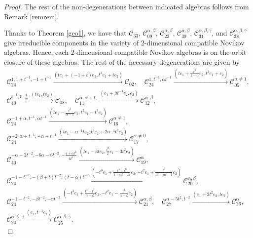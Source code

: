 \documentclass[pdftex]{sigma}
\numberwithin{equation}{section}
\begin{document}
\begin{proof}
The rest of the non-degenerations between indicated algebras follows from Remark \ref{remrem}.

Thanks to Theorem \ref{geo1}, we have that
$ \mathcal{C}_{33}$,
$ \mathcal{C}_{09}^{\alpha,\beta}$,
$ \mathcal{C}_{22}^{\alpha,\beta}$,
$ \mathcal{C}_{39}^{\alpha,\beta}$,
$ \mathcal{C}_{31}^{\alpha,\beta, \gamma}$, and
$ \mathcal{C}_{38}^{\alpha,\beta,\gamma}$
 give irreducible components in the variety of $2$-dimensional compatible Novikov algebras.
 Hence, each $2$-dimensional compatible Novikov algebras is on the orbit closure of these algebras. The rest of the necessary degenerations are given by
\begin{gather*}
 \mathcal{C}_{24}^{ 1,1+ t^{-1}, -1+ t^{-1}} \xrightarrow{ (te_1 +(-1+t) e_2, t^{2}e_1+t e_2 )} \mathcal{C}_{02} ,\quad
 \mathcal{C}_{24}^{ 1, t^{-1}, \alpha t^{-1}} \xrightarrow{ (te_1 +\frac{t^2}{1-\alpha} e_2, t^{2}e_1+ e_2 )} \mathcal{C}_{05}^{\alpha\neq 1} ,\\
 \mathcal{C}_{40}^{t^{-1},0, \frac{1}{2t}} \xrightarrow{ (te_1, te_2)} \mathcal{C}_{08} ,\quad
 \mathcal{C}_{11}^{\alpha,\alpha+t, } \xrightarrow{ (e_1+\beta t^{-1} e_2, e_2)} \mathcal{C}_{12}^{\alpha,\beta} ,\\
 \mathcal{C}_{24}^{ -1+\alpha, t^{-1}, \alpha t^{-1}} \xrightarrow{ (te_1 -\frac{t^2}{\alpha-1} e_2, t^{2}e_1-t^3 e_2 )} \mathcal{C}_{16}^{\alpha\neq 1} ,\\
 \mathcal{C}_{24}^{ -2, \alpha+t^{-1}, -\alpha +t^{-1}} \xrightarrow{ (te_1 -\alpha^{-1}t e_2, t^{2}e_1+2\alpha^{-1}t^2 e_2 )} \mathcal{C}_{17}^{\alpha\neq 0} ,\\
 \mathcal{C}_{40}^{ -\alpha -2t^{-2}, -6\alpha -6t^{-2}, -\frac{4+\alpha t^2}{6t^2}} \xrightarrow{ (te_1-3 te_2, \frac{t^2}{2}e_1-3 t^2e_2 )} \mathcal{C}_{19}^{\alpha} ,\\
 \mathcal{C}_{24}^{ -1-t^{-2}, -(\beta+t)t^{-2}, (t-\alpha) t^{-2}} \xrightarrow{ (-t^3e_1 +\frac{t^4+t^6}{1+\alpha t -\beta t} e_2, -t^{2}e_1+ \frac{t^5}{\beta t -\alpha t -1}e_2 )} \mathcal{C}_{20}^{\alpha,\beta} ,\\
 \mathcal{C}_{24}^{ -1-t^{-2}, -\beta t^{-2}, -\alpha t^{-2}} \xrightarrow{ (-t^3e_1 +\frac{t^3+t^5}{\alpha -\beta } e_2, -t^{2}e_1- \frac{t^4}{ \alpha -\beta}e_2 )} \mathcal{C}_{21}^{\alpha,\beta} ,\quad
 \mathcal{C}_{27}^{\alpha -5t^2,t^{-2}} \xrightarrow{ (e_1 + 2t^2 e_2, t e_2 )} \mathcal{C}_{26}^{\alpha} ,\\
 \mathcal{C}_{24}^{ \alpha, \beta, \gamma} \xrightarrow{ (e_1, t^{-1}e_2 )} \mathcal{C}_{25}^{\alpha, \beta, \gamma}. \tag*{\qed}
\end{gather*} \renewcommand{\qed}{}
\end{proof}
\end{document}
